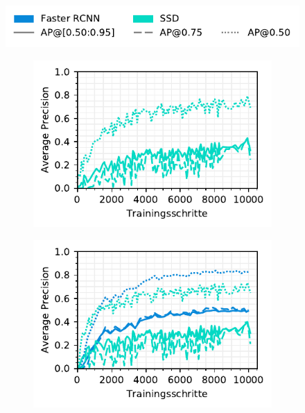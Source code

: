 \begin{figure}[H]
  \captionsetup{width=.9\linewidth}
  \caption{TODO}
  \label{fig:3ap-map}
  \centering
  \includegraphics[scale=1]{graphics/matplot/img-detection__legend_3.pdf}
  \begin{subfigure}[t]{0.5\linewidth}
    \centering
    \includegraphics[scale=1]{graphics/matplot/img-detection__all__ap__train.pdf}
    \label{fig:3ap-map:map_train}
    \vspace{2ex}
  \end{subfigure}%
  \begin{subfigure}[t]{0.5\linewidth}
    \centering
    \includegraphics[scale=1]{graphics/matplot/img-detection__all__ap.pdf}
    \label{fig:3ap-map:map_val}
    \vspace{2ex}
  \end{subfigure}
\end{figure}

